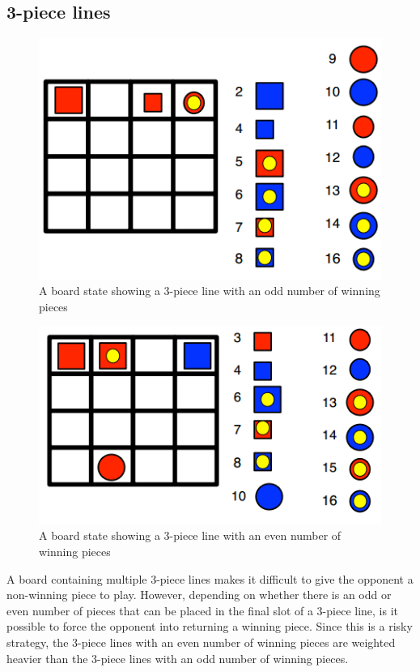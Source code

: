 \subsection{3-piece lines}
\begin{figure}[htb]
\label{fig: 3-odd}
\includegraphics{pictures/3-odd.png}
\caption[A 3-piece line in \quarto{}]{A board state showing a 3-piece line with an odd number of winning pieces}
\end{figure}
\begin{figure}[htb]
\label{fig: 3-even}
\includegraphics{pictures/3-even.png}
\caption[A 3-piece line in \quarto{}]{A board state showing a 3-piece line with an even number of winning pieces}
\end{figure}
A board containing multiple 3-piece lines makes it difficult to give the 
opponent a non-winning piece to play. However, depending on whether there is 
an odd or even number of pieces that can be placed in the final slot of a 
3-piece line, is it possible to force the opponent into returning a winning 
piece. Since this is a risky strategy, the 3-piece lines with an even number 
of winning pieces are weighted heavier than the 3-piece lines with an odd 
number of winning pieces.

